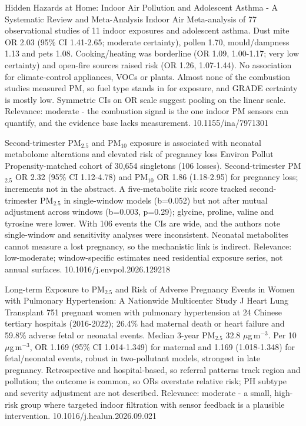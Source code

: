 \documentclass[10pt]{article}
\begin{document}
\par{}\baselineskip{}\baselineskip
{}

{Hidden Hazards at Home: Indoor Air Pollution and Adolescent Asthma - A Systematic Review and Meta-Analysis}
{Indoor Air}
{Meta-analysis of 77 observational studies of 11 indoor exposures and adolescent asthma. Dust mite OR 2.03 (95\% CI 1.41-2.65; moderate certainty), pollen 1.70, mould/dampness 1.13 and pets 1.08. Cooking/heating was borderline (OR 1.09, 1.00-1.17; very low certainty) and open-fire sources raised risk (OR 1.26, 1.07-1.44). No association for climate-control appliances, VOCs or plants. Almost none of the combustion studies measured PM, so fuel type stands in for exposure, and GRADE certainty is mostly low. Symmetric CIs on OR scale suggest pooling on the linear scale. Relevance: moderate - the combustion signal is the one indoor PM sensors can quantify, and the evidence base lacks measurement.}
{10.1155/ina/7971301}

\par{}\baselineskip{}\baselineskip
{}

{Second-trimester PM$_{2.5}$ and PM$_{10}$ exposure is associated with neonatal metabolome alterations and elevated risk of pregnancy loss}
{Environ Pollut}
{Propensity-matched cohort of 30,654 singletons (106 losses). Second-trimester PM$_{2.5}$ OR 2.32 (95\% CI 1.12-4.78) and PM$_{10}$ OR 1.86 (1.18-2.95) for pregnancy loss; increments not in the abstract. A five-metabolite risk score tracked second-trimester PM$_{2.5}$ in single-window models (b=0.052) but not after mutual adjustment across windows (b=0.003, p=0.29); glycine, proline, valine and tyrosine were lower. With 106 events the CIs are wide, and the authors note single-window and sensitivity analyses were inconsistent. Neonatal metabolites cannot measure a lost pregnancy, so the mechanistic link is indirect. Relevance: low-moderate; window-specific estimates need residential exposure series, not annual surfaces.}
{10.1016/j.envpol.2026.129218}

{Long-term Exposure to PM$_{2.5}$ and Risk of Adverse Pregnancy Events in Women with Pulmonary Hypertension: A Nationwide Multicenter Study}
{J Heart Lung Transplant}
{751 pregnant women with pulmonary hypertension at 24 Chinese tertiary hospitals (2016-2022); 26.4\% had maternal death or heart failure and 59.8\% adverse fetal or neonatal events. Median 3-year PM$_{2.5}$ 32.8 $\mu$g\,m$^{-3}$. Per 10 $\mu$g\,m$^{-3}$, OR 1.169 (95\% CI 1.014-1.349) for maternal and 1.169 (1.018-1.348) for fetal/neonatal events, robust in two-pollutant models, strongest in late pregnancy. Retrospective and hospital-based, so referral patterns track region and pollution; the outcome is common, so ORs overstate relative risk; PH subtype and severity adjustment are not described. Relevance: moderate - a small, high-risk group where targeted indoor filtration with sensor feedback is a plausible intervention.}
{10.1016/j.healun.2026.09.021}
\end{document}
